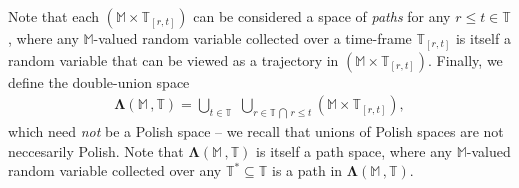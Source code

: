 \documentclass[12pt,a4paper]{article}
\def\T{\mathbb{T}}
\begin{document}
Note that each $(\mathbb M\times\T_{[r,t]})$ can be considered a space of \emph{paths} for any $r\leq t\in\T$, where any $\mathbb M$-valued random variable collected over a time-frame $\T_{[r,t]}$ is itself a random variable that can be viewed as a trajectory in $(\mathbb M\times\T_{[r,t]})$.
Finally, we define the double-union space
%
\begin{align}
\boldsymbol{\Lambda}(\mathbb M \,, \T) = \bigcup_{t\in\T} \,\, \bigcup_{r\in \T \, \bigcap \, r \leq t} \left(\mathbb M\times\T_{[r,t]}\right),
\end{align}
%
which need \emph{not} be a Polish space -- we recall that unions of Polish spaces are not neccesarily Polish. Note that $\boldsymbol{\Lambda}(\mathbb M \,, \T)$ is itself a path space, where any $\mathbb M$-valued random variable collected over any $\T^*\subseteq\T$ is a path in $\boldsymbol{\Lambda}(\mathbb M \,, \T)$. 
\end{document}

